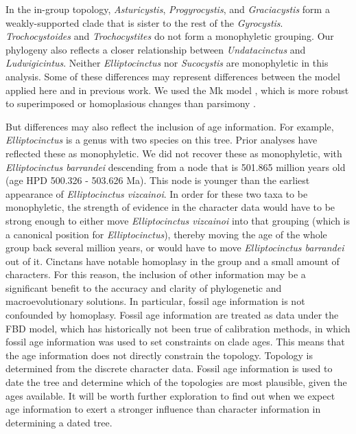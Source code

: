 \documentclass{article}
\begin{document}
In the in-group topology, \textit{Asturicystis}, \textit{Progyrocystis}, and \textit{Graciacystis} form a weakly-supported clade that is sister to the rest of the \textit{Gyrocystis}.
\textit{Trochocystoides} and \textit{Trochocystites} do not form a monophyletic grouping. 
Our phylogeny also reflects a closer relationship between \textit{Undatacinctus} and \textit{Ludwigicintus}. 
Neither \textit{Elliptocinctus} nor \textit{Sucocystis} are monophyletic in this analysis.
Some of these differences may represent differences between the model applied here and in previous work.
We used the Mk model \citep{Lewis2001}, which is more robust to superimposed or homoplasious changes than parsimony \citep{Felsenstein1978, Wright2014}.

But differences may also reflect the inclusion of age information.
For example, \textit{Elliptocinctus} is a genus with two species on this tree. 
Prior analyses have reflected these as monophyletic.
We did not recover these as monophyletic, with \textit{Elliptocinctus barrandei} descending from a node that is 501.865 million years old (age HPD 500.326 - 503.626 Ma).
This node is younger than the earliest appearance of \textit{Elliptocinctus vizcainoi}.
In order for these two taxa to be monophyletic, the strength of evidence in the character data would have to be strong enough to either move \textit{Elliptocinctus vizcainoi} into that grouping (which is a canonical position for \textit{Elliptocinctus}), thereby moving the age of the whole group back several million years, or would have to move \textit{Elliptocinctus barrandei} out of it.
Cinctans have notable homoplasy in the group and a small amount of characters.
For this reason, the inclusion of other information may be a significant benefit to the accuracy and clarity of phylogenetic and macroevolutionary solutions.
In particular, fossil age information is not confounded by homoplasy.
Fossil age information are treated as data under the FBD model, which has historically not been true of calibration methods, in which fossil age information was used to set constraints on clade ages. 
This means that the age information does not directly constrain the topology.
Topology is determined from the discrete character data.
Fossil age information is used to date the tree and determine which of the topologies are most plausible, given the ages available.
It will be worth further exploration to find out when we expect age information to exert a stronger influence than character information in determining a dated tree.
\end{document}
